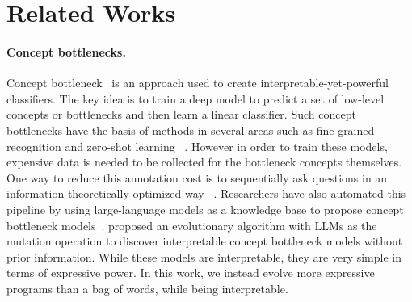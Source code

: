 \section{Related Works}
\label{sec:related_works}
\paragraph{Concept bottlenecks.}
Concept bottleneck~\citep{koh20concept,yang2023language,oikarinen2023label} is an approach used to create interpretable-yet-powerful classifiers. 
The key idea is to train a deep model to predict a set of low-level concepts or bottlenecks and then learn a linear classifier. 
Such concept bottlenecks have the basis of methods in several areas such as fine-grained recognition \citep{ferrari2007learning, huang2016part,zhou2018interpretable,tang2020revisiting} and zero-shot learning ~\citep{lampert-13,akata-15,kodirov-17}.
However in order to train these models, expensive data is needed to be collected for the bottleneck concepts themselves. 
One way to reduce this annotation cost is to sequentially ask questions in an information-theoretically optimized way ~\citep{chattopadhyay2024bootstrapping, chattopadhyay2024information}.
Researchers have also automated this pipeline by using large-language models as a knowledge base to propose concept bottleneck models~\citep{menon2022visual,pratt2023does, han2023llms}. 
\cite{llmmutate-24} proposed an evolutionary algorithm with LLMs as the mutation operation to discover interpretable concept bottleneck models without prior information. While these models are interpretable, they are very simple in terms of expressive power.  
In this work, we instead evolve more expressive programs than a bag of words, while being interpretable.

